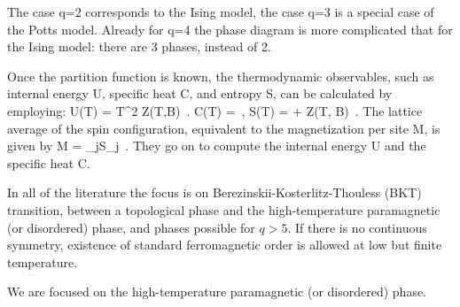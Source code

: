 The case q=2 corresponds to the Ising model, the case q=3 is a special
case of the Potts model. Already for q=4 the phase diagram is more
complicated that for the Ising model: there are 3 phases, instead of 2.


Once the partition function is known, the thermodynamic observables, such
as internal energy U, specific heat C, and entropy S, can be calculated
by employing:
\beq
U(T) = T^2  \ln Z(T,B)
\,.
\beq
C(T) =
\,,
\beq
S(T) =  + \ln Z(T, B)
\,.
The lattice average of the spin configuration, equivalent to the
magnetization per site M, is given by
\beq
M =  \sum_{j}S_j
\,.
They go on to compute the internal energy U and the specific heat C.

In all of the literature the focus is on  Berezinskii-Kosterlitz-Thouless
(BKT) transition,  between a topological  phase  and  the
high-temperature  paramagnetic (or disordered) phase, and phases possible
for $q>5$. If there is no continuous symmetry,  existence of standard
ferromagnetic order is allowed at low but finite temperature.

We are focused on the high-temperature  paramagnetic (or disordered)
phase.

